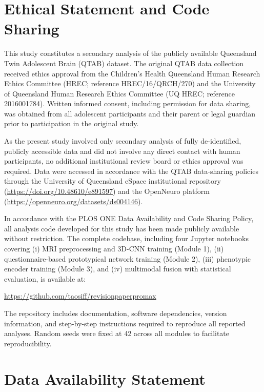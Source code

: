 \documentclass[10pt,letterpaper]{article}
\begin{document}
\section*{Ethical Statement and Code Sharing}

This study constitutes a secondary analysis of the publicly available Queensland Twin Adolescent Brain (QTAB) dataset. The original QTAB data collection received ethics approval from the Children's Health Queensland Human Research Ethics Committee (HREC; reference HREC/16/QRCH/270) and the University of Queensland Human Research Ethics Committee (UQ HREC; reference 2016001784). Written informed consent, including permission for data sharing, was obtained from all adolescent participants and their parent or legal guardian prior to participation in the original study.

As the present study involved only secondary analysis of fully de-identified, publicly accessible data and did not involve any direct contact with human participants, no additional institutional review board or ethics approval was required. Data were accessed in accordance with the QTAB data-sharing policies through the University of Queensland eSpace institutional repository (\url{https://doi.org/10.48610/e891597}) and the OpenNeuro platform (\url{https://openneuro.org/datasets/ds004146}).

In accordance with the PLOS ONE Data Availability and Code Sharing Policy, all analysis code developed for this study has been made publicly available without restriction. The complete codebase, including four Jupyter notebooks covering (i) MRI preprocessing and 3D-CNN training (Module 1), (ii) questionnaire-based prototypical network training (Module 2), (iii) phenotypic encoder training (Module 3), and (iv) multimodal fusion with statistical evaluation, is available at:

\begin{center}
\url{https://github.com/taosiff/revisionpaperpromax}
\end{center}

The repository includes documentation, software dependencies, version information, and step-by-step instructions required to reproduce all reported analyses. Random seeds were fixed at 42 across all modules to facilitate reproducibility.

\section*{Data Availability Statement}
\end{document}
